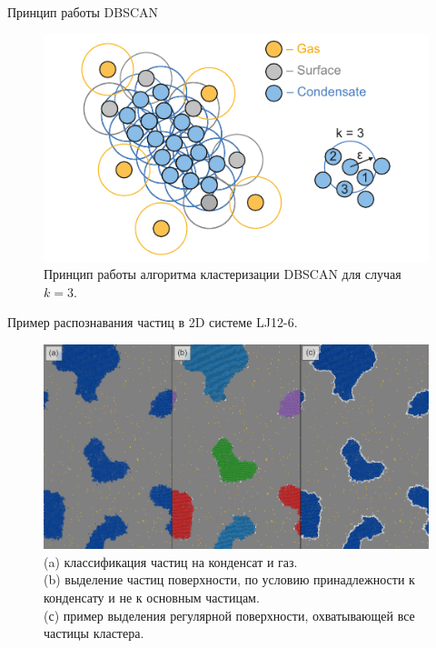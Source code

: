 \documentclass{beamer}
\begin{document}
\begin{frame}{Принцип работы DBSCAN}
\footnotesize{

\begin{figure}[!t]
    \centering
    \includegraphics[width=0.9\linewidth]{kepsilon.pdf}
    \caption{Принцип работы алгоритма кластеризации DBSCAN для случая $k = 3$.}
    \label{kepsilon}
\end{figure}
}

\end{frame}








\begin{frame}{Пример распознавания частиц в 2D системе LJ12-6.}
\footnotesize{


\begin{figure}[!t]
    \centering
    \includegraphics[width=0.8\linewidth]{PRIMe-FIgure104.pdf}
    \caption{(a) классификация частиц на конденсат и газ. \\
    (b) выделение частиц поверхности, по условию принадлежности к конденсату и не к основным частицам. \\
    (с) пример выделения регулярной поверхности, охватывающей все частицы кластера.}
    \label{DBSCAN-Illustr}
\end{figure}

}

\end{frame}
\end{document}
